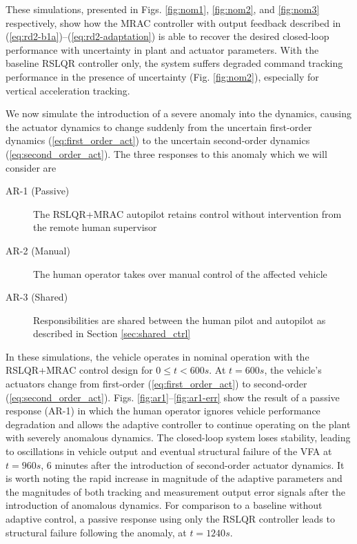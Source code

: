 \documentclass[english]{ifacconf}
\begin{document}
These simulations, presented in Figs. \ref{fig:nom1}, \ref{fig:nom2}, and \ref{fig:nom3} respectively, show how the MRAC controller with output feedback described in (\ref{eq:rd2-b1a})--(\ref{eq:rd2-adaptation}) is able to recover the desired closed-loop performance with uncertainty in plant and actuator parameters. With the baseline RSLQR controller only, the system suffers degraded command tracking performance in the presence of uncertainty (Fig. \ref{fig:nom2}), especially for vertical acceleration tracking.

We now simulate the introduction of a severe anomaly into the dynamics, causing the actuator dynamics to change suddenly from the uncertain first-order dynamics (\ref{eq:first_order_act}) to the uncertain second-order dynamics (\ref{eq:second_order_act}). The three responses to this anomaly which we will consider are
\begin{description}
	\item[AR-1 (Passive)] The RSLQR+MRAC autopilot retains control without intervention from the remote human supervisor
	\item[AR-2 (Manual)] The human operator takes over manual control of the affected vehicle
	\item[AR-3 (Shared)] Responsibilities are shared between the human pilot and autopilot as described in Section \ref{sec:shared_ctrl}
\end{description}

In these simulations, the vehicle operates in nominal operation with the RSLQR+MRAC control design for $0 \leq t < 600 s$. At $t = 600 s$, the vehicle's actuators change from first-order (\ref{eq:first_order_act}) to second-order (\ref{eq:second_order_act}). Figs. \ref{fig:ar1}--\ref{fig:ar1-err} show the result of a passive response (AR-1) in which the human operator ignores vehicle performance degradation and allows the adaptive controller to continue operating on the plant with severely anomalous dynamics. The closed-loop system loses stability, leading to oscillations in vehicle output and eventual structural failure of the VFA at $t = 960s$, 6 minutes after the introduction of second-order actuator dynamics. It is worth noting the rapid increase in magnitude of the adaptive parameters and the magnitudes of both tracking and measurement output error signals after the introduction of anomalous dynamics. For comparison to a baseline without adaptive control, a passive response using only the RSLQR controller leads to structural failure following the anomaly, at $t = 1240s$.
\end{document}
